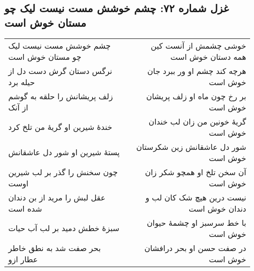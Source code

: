 \begin{center}
\section*{غزل شماره ۷۲: چشم خوشش مست نیست لیک چو مستان خوش است}
\label{sec:072}
\begin{longtable}{l p{0.5cm} r}
چشم خوشش مست نیست لیک چو مستان خوش است
&&
خوشی چشمش از آنست کین همه دستان خوش است
\\
نرگس دستان گرش دست دل از حیله برد
&&
هرچه کند چشم او ور ببرد جان خوش است
\\
زلف پریشانش را حلقه به گوشم از آنک
&&
بر رخ چون ماه او زلف پریشان خوش است
\\
خندهٔ شیرین او گریهٔ من تلخ کرد
&&
گریهٔ خونین من زان لب خندان خوش است
\\
پستهٔ شیرین او شور دل عاشقانش
&&
شور دل عاشقانش زین شکرستان خوش است
\\
چون سخنش را گذر بر لب شیرین اوست
&&
آن سخن تلخ او همچو شکر زان خوش است
\\
عقل لبش را مرید از بن دندان شده است
&&
نیست درین هیچ شک کان لب و دندان خوش است
\\
سبزهٔ خطش دمید بر لب آب حیات
&&
با خط سرسبز او چشمهٔ حیوان خوش است
\\
بحر صفت شد به نطق خاطر عطار ازو
&&
در صفت حسن او بحر درافشان خوش است
\\
\end{longtable}
\end{center}
